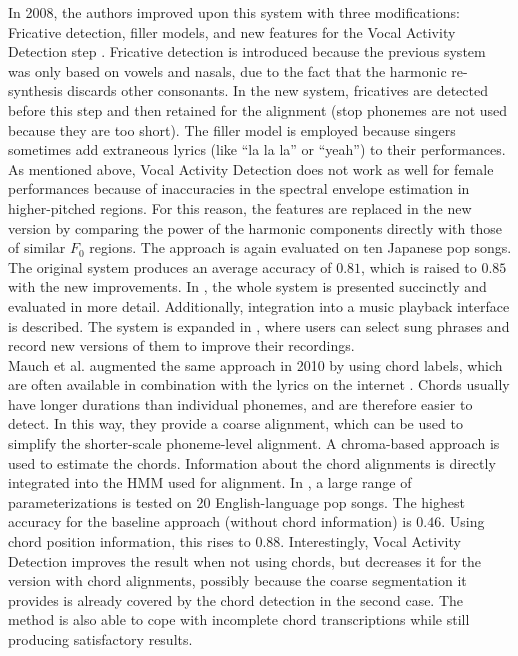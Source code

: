 In 2008, the authors improved upon this system with three modifications: Fricative detection, filler models, and new features for the Vocal Activity Detection step \cite{fujihara}. Fricative detection is introduced because the previous system was only based on vowels and nasals, due to the fact that the harmonic re-synthesis discards other consonants. In the new system, fricatives are detected before this step and then retained for the alignment (stop phonemes are not used because they are too short).
The filler model is employed because singers sometimes add extraneous lyrics (like ``la la la'' or ``yeah'') to their performances.
As mentioned above, Vocal Activity Detection does not work as well for female performances because of inaccuracies in the spectral envelope estimation in higher-pitched regions. For this reason, the features are replaced in the new version by comparing the power of the harmonic components directly with those of similar $F_0$ regions.
The approach is again evaluated on ten Japanese pop songs. The original system produces an average accuracy of $0.81$, which is raised to $0.85$ with the new improvements.
In \cite{FujiharaGOO11}, the whole system is presented succinctly and evaluated in more detail. Additionally, integration into a music playback interface is described. The system is expanded in \cite{vocarefiner}, where users can select sung phrases and record new versions of them to improve their recordings.\\

Mauch et al. augmented the same approach in 2010 by using chord labels, which are often available in combination with the lyrics on the internet \cite{mauch_alignment2010}\cite{mauch_alignment2}. Chords usually have longer durations than individual phonemes, and are therefore easier to detect. In this way, they provide a coarse alignment, which can be used to simplify the shorter-scale phoneme-level alignment. A chroma-based approach is used to estimate the chords. Information about the chord alignments is directly integrated into the HMM used for alignment.
In \cite{mauch_alignment2}, a large range of parameterizations is tested on 20 English-language pop songs. The highest accuracy for the baseline approach (without chord information) is $0.46$. Using chord position information, this rises to $0.88$. Interestingly, Vocal Activity Detection improves the result when not using chords, but decreases it for the version with chord alignments, possibly because the coarse segmentation it provides is already covered by the chord detection in the second case. The method is also able to cope with incomplete chord transcriptions while still producing satisfactory results.\\

